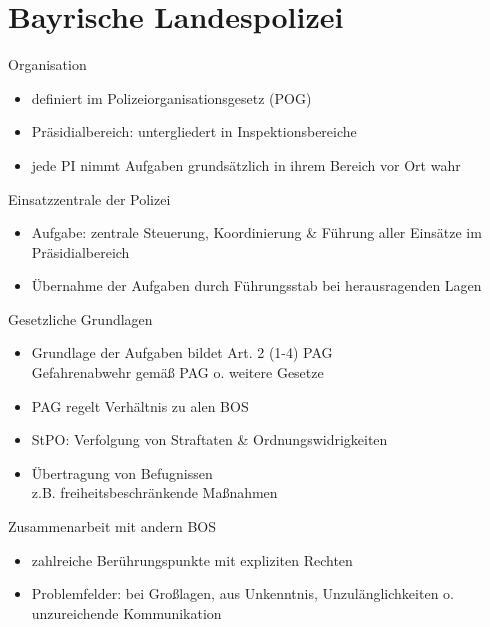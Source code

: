 \section{Bayrische Landespolizei}
\begin{sectionbox}{Organisation}
    \begin{itemize}
        \item definiert im Polizeiorganisationsgesetz (POG)
        \item Präsidialbereich: untergliedert in Inspektionsbereiche
        \item jede PI nimmt Aufgaben grundsätzlich in ihrem Bereich vor Ort wahr
    \end{itemize}
\end{sectionbox}
\begin{sectionbox}{Einsatzzentrale der Polizei}
    \begin{itemize}
        \item Aufgabe: zentrale Steuerung, Koordinierung \& Führung aller Einsätze im Präsidialbereich
        \item Übernahme der Aufgaben durch Führungsstab bei herausragenden Lagen
    \end{itemize}
\end{sectionbox}
\begin{sectionbox}{Gesetzliche Grundlagen}
    \begin{itemize}
        \item Grundlage der Aufgaben bildet Art. 2 (1-4) PAG\\
        \ra Gefahrenabwehr gemäß PAG o. weitere Gesetze
        \item PAG regelt Verhältnis zu alen BOS
        \item StPO: Verfolgung von Straftaten \& Ordnungswidrigkeiten
        \item Übertragung von Befugnissen\\
        \ra z.B. freiheitsbeschränkende Maßnahmen
    \end{itemize}
\end{sectionbox}
\begin{sectionbox}{Zusammenarbeit mit andern BOS}
    \begin{itemize}
        \item zahlreiche Berührungspunkte mit expliziten Rechten
        \item Problemfelder: bei Großlagen, aus Unkenntnis, Unzulänglichkeiten o. unzureichende Kommunikation
    \end{itemize}
\end{sectionbox}